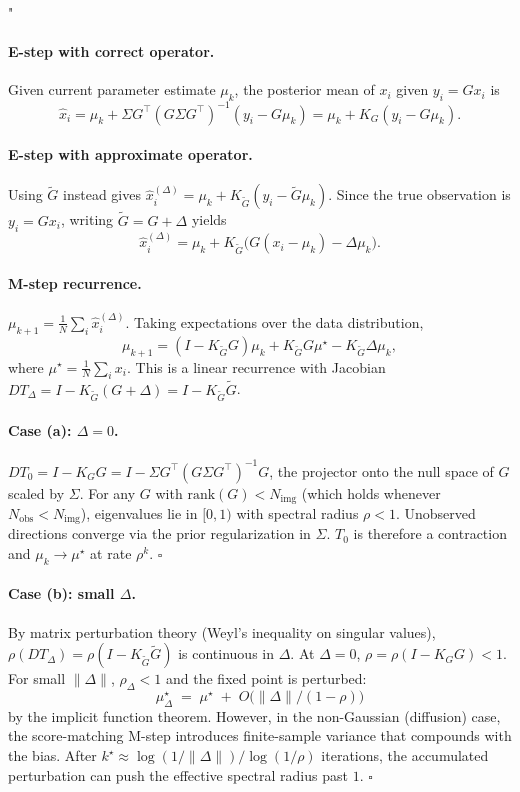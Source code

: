 "\documentclass{article}
\theoremstyle{plain}
\theoremstyle{definition}
\theoremstyle{remark}
\newcommand{\Nimg}{N_{\mathrm{img}}}
\newcommand{\Nobs}{N_{\mathrm{obs}}}
\begin{document}
\paragraph{E-step with correct operator.}
Given current parameter estimate $\mu_k$, the posterior mean of $x_i$ given $y_i = Gx_i$ is
$$
\hat{x}_i = \mu_k + \Sigma G^\top (G \Sigma G^\top)^{-1}(y_i - G\mu_k) = \mu_k + K_G(y_i - G\mu_k).
$$

\paragraph{E-step with approximate operator.}
Using $\tilde{G}$ instead gives $\hat{x}_i^{(\Delta)} = \mu_k + K_{\tilde{G}}(y_i - \tilde{G}\mu_k)$. Since the true observation is $y_i = Gx_i$, writing $\tilde{G} = G + \Delta$ yields
$$
\hat{x}_i^{(\Delta)} = \mu_k + K_{\tilde{G}}\bigl(G(x_i - \mu_k) - \Delta \mu_k\bigr).
$$

\paragraph{M-step recurrence.}
$\mu_{k+1} = \frac{1}{N}\sum_i \hat{x}_i^{(\Delta)}$. Taking expectations over the data distribution,
$$
\mu_{k+1} = (I - K_{\tilde{G}} G)\mu_k + K_{\tilde{G}} G \mu^\star - K_{\tilde{G}} \Delta \mu_k,
$$
where $\mu^\star = \frac{1}{N}\sum_i x_i$. This is a linear recurrence with Jacobian $DT_\Delta = I - K_{\tilde{G}}(G + \Delta) = I - K_{\tilde{G}} \tilde{G}$.

\paragraph{Case (a): $\Delta = 0$.}
$DT_0 = I - K_G G = I - \Sigma G^\top (G \Sigma G^\top)^{-1} G$, the projector onto the null space of $G$ scaled by $\Sigma$. For any $G$ with $\mathrm{rank}(G) < \Nimg$ (which holds whenever $\Nobs < \Nimg$), eigenvalues lie in $[0, 1)$ with spectral radius $\rho < 1$. Unobserved directions converge via the prior regularization in $\Sigma$. $T_0$ is therefore a contraction and $\mu_k \to \mu^\star$ at rate $\rho^k$. $\square$

\paragraph{Case (b): small $\Delta$.}
By matrix perturbation theory (Weyl's inequality on singular values), $\rho(DT_\Delta) = \rho(I - K_{\tilde{G}}\tilde{G})$ is continuous in $\Delta$. At $\Delta = 0$, $\rho = \rho(I - K_G G) < 1$. For small $\|\Delta\|$, $\rho_\Delta < 1$ and the fixed point is perturbed:
$$
\mu^\star_\Delta \;=\; \mu^\star \;+\; O\bigl(\|\Delta\|/(1-\rho)\bigr)
$$
by the implicit function theorem. However, in the non-Gaussian (diffusion) case, the score-matching M-step introduces finite-sample variance that compounds with the bias. After $k^\star \approx \log(1/\|\Delta\|)/\log(1/\rho)$ iterations, the accumulated perturbation can push the effective spectral radius past $1$. $\square$
\end{document}
